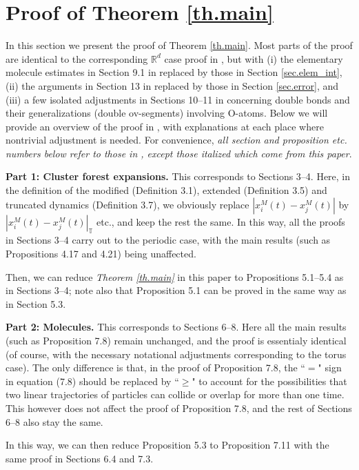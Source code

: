 \documentclass[10pt, reqno]{amsart}
\newcommand{\Rb}{\mathbb R}
\newcommand{\Tb}{\mathbb T}
\theoremstyle{definition}
\theoremstyle{remark}
\numberwithin{equation}{section}
\begin{document}
\section{Proof of Theorem \ref{th.main}}\label{sec.proof_main} In this section we present the proof of Theorem \ref{th.main}. Most parts of the proof are identical to the corresponding $\Rb^d$ case proof in \cite{DHM24}, but with (i) the elementary molecule estimates in Section 9.1 in \cite{DHM24} replaced by those in Section \ref{sec.elem_int}, (ii) the arguments in Section 13 in \cite{DHM24} replaced by those in Section \ref{sec.error}, and (iii) a few isolated adjustments in Sections 10--11 in \cite{DHM24} concerning double bonds and their generalizations (double ov-segments) involving O-atoms. Below we will provide an overview of the proof in \cite{DHM24}, with explanations at each place where nontrivial adjustment is needed. For convenience, \emph{all section and proposition etc. numbers below refer to those in \cite{DHM24}, except those italized which come from this paper}.

\medskip
\textbf{Part 1: Cluster forest expansions.} This corresponds to Sections 3--4. Here, in the definition of the modified (Definition 3.1), extended (Definition 3.5) and truncated dynamics (Definition 3.7), we obviously replace $|x_i^M(t)-x_j^M(t)|$ by $|x_i^M(t)-x_j^M(t)|_\Tb$ etc., and keep the rest the same. In this way, all the proofs in Sections 3--4 carry out to the periodic case, with the main results (such as Propositions 4.17 and 4.21) being unaffected.

Then, we can reduce \emph{Theorem \ref{th.main}} in this paper to Propositions 5.1--5.4 as in Sections 3--4; note also that Proposition 5.1 can be proved in the same way as in Section 5.3.

\medskip
\textbf{Part 2: Molecules.} This corresponds to Sections 6--8. Here all the main results (such as Proposition 7.8) remain unchanged, and the proof is essentialy identical (of course, with the necessary notational adjustments corresponding to the torus case). The only difference is that, in the proof of Proposition 7.8, the ``$=$" sign in equation (7.8) should be replaced by ``$\geq$" to account for the possibilities that two linear trajectories of particles can collide or overlap for more than one time. This however does not affect the proof of Proposition 7.8, and the rest of Sections 6--8 also stay the same.

In this way, we can then reduce Proposition 5.3 to Proposition 7.11 with the same proof in Sections 6.4 and 7.3.
\end{document}
